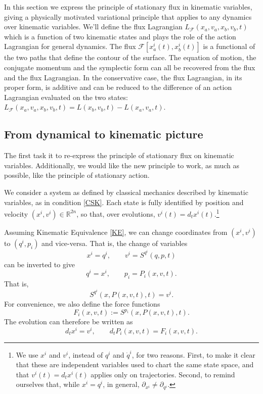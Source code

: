 \documentclass[12pt]{article}
\begin{document}
In this section we express the principle of stationary flux in kinematic variables, giving a physically motivated variational principle that applies to any dynamics over kinematic variables. We'll define the flux Lagrangian $L_{\mathcal{F}}(x_a, v_a, x_b, v_b, t)$ which is a function of two kinematic states and plays the role of the action Lagrangian for general dynamics. The flux $\mathcal{F}[x^i_a(t), x^i_b(t)]$ is a functional of the two paths that define the contour of the surface. The equation of motion, the conjugate momentum and the symplectic form can all be recovered from the flux and the flux Lagrangian. In the conservative case, the flux Lagrangian, in its proper form, is additive and can be reduced to the difference of an action Lagrangian evaluated on the two states: $L_{\mathcal{F}}(x_a, v_a, x_b, v_b, t) = L(x_b, v_b, t) - L(x_a, v_a, t)$.

\subsection{From dynamical to kinematic picture}

The first task it to re-express the principle of stationary flux on kinematic variables. Additionally, we would like the new principle to work, as much as possible, like the principle of stationary action.

We consider a system as defined by classical mechanics described by kinematic variables, as in condition \ref{CSK}. Each state is fully identified by position and velocity $(x^i, v^i) \in \mathbb{R}^{2n}$, so that, over evolutions, $v^i (t) = d_t x^i(t)$.\footnote{We use $x^i$ and $v^i$, instead of $q^i$ and $\dot{q}^i$, for two reasons. First, to make it clear that these are independent variables used to chart the same state space, and that $v^i (t) = d_t x^i(t)$ applies only on trajectories. Second, to remind ourselves that, while $x^i = q^i$, in general, $\partial_{x^i} \neq \partial_{q^i}$.}

Assuming Kinematic Equivalence \ref{KE}, we can change coordinates from $(x^i, v^i)$ to $(q^i, p_i)$ and vice-versa. That is, the change of variables
\begin{equation}
	x^i=q^i,
	\qquad
	v^i=S^{q^i}(q,p,t)
\end{equation}
can be inverted to give
\begin{equation}
	q^i=x^i,
	\qquad
	p_i=P_i(x,v,t).
\end{equation}
That is,
\begin{equation}
	S^{q^i}(x,P(x,v,t),t)=v^i.
\end{equation}
For convenience, we also define the force functions
\begin{equation}
	F_i(x,v,t):=S^{p_i}(x,P(x,v,t),t).
\end{equation}
The evolution can therefore be written as
\begin{equation}\label{eq:kinematicEvolution}
	d_t x^i=v^i,
	\qquad
	d_tP_i(x,v,t)=F_i(x,v,t).
\end{equation}
\end{document}
